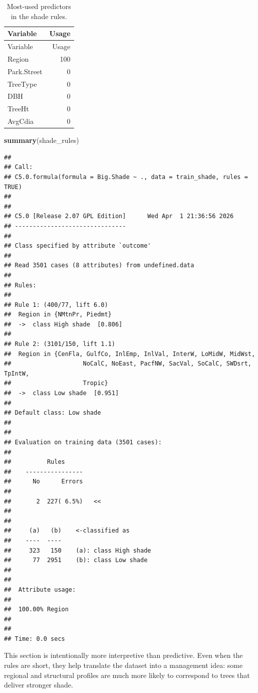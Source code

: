 \documentclass[
  11pt,
]{article}
\newenvironment{Shaded}{\begin{snugshade}}{\end{snugshade}}
\newcommand{\FunctionTok}[1]{\textcolor[rgb]{0.13,0.29,0.53}{\textbf{#1}}}
\newcommand{\NormalTok}[1]{#1}
\begin{document}
\begin{longtable}[]{@{}lr@{}}
\caption{Most-used predictors in the shade rules.}\tabularnewline
\toprule\noalign{}
Variable & Usage \\
\midrule\noalign{}
\endfirsthead
\toprule\noalign{}
Variable & Usage \\
\midrule\noalign{}
\endhead
\bottomrule\noalign{}
\endlastfoot
Region & 100 \\
Park.Street & 0 \\
TreeType & 0 \\
DBH & 0 \\
TreeHt & 0 \\
AvgCdia & 0 \\
\end{longtable}

\begin{Shaded}
\begin{Highlighting}[]
\FunctionTok{summary}\NormalTok{(shade\_rules)}
\end{Highlighting}
\end{Shaded}

\begin{verbatim}
## 
## Call:
## C5.0.formula(formula = Big.Shade ~ ., data = train_shade, rules = TRUE)
## 
## 
## C5.0 [Release 2.07 GPL Edition]      Wed Apr  1 21:36:56 2026
## -------------------------------
## 
## Class specified by attribute `outcome'
## 
## Read 3501 cases (8 attributes) from undefined.data
## 
## Rules:
## 
## Rule 1: (400/77, lift 6.0)
##  Region in {NMtnPr, Piedmt}
##  ->  class High shade  [0.806]
## 
## Rule 2: (3101/150, lift 1.1)
##  Region in {CenFla, GulfCo, InlEmp, InlVal, InterW, LoMidW, MidWst,
##                    NoCalC, NoEast, PacfNW, SacVal, SoCalC, SWDsrt, TpIntW,
##                    Tropic}
##  ->  class Low shade  [0.951]
## 
## Default class: Low shade
## 
## 
## Evaluation on training data (3501 cases):
## 
##          Rules     
##    ----------------
##      No      Errors
## 
##       2  227( 6.5%)   <<
## 
## 
##     (a)   (b)    <-classified as
##    ----  ----
##     323   150    (a): class High shade
##      77  2951    (b): class Low shade
## 
## 
##  Attribute usage:
## 
##  100.00% Region
## 
## 
## Time: 0.0 secs
\end{verbatim}

This section is intentionally more interpretive than predictive. Even
when the rules are short, they help translate the dataset into a
management idea: some regional and structural profiles are much more
likely to correspond to trees that deliver stronger shade.
\end{document}
